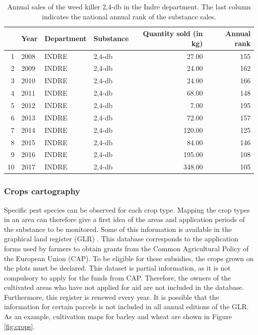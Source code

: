 \begin{table}[ht]
\centering
\begin{tabular}{rlllrr}
  \hline
 & Year & Department & Substance & Quantity sold (in kg) & Annual rank \\ 
  \hline
1 & 2008 & INDRE & 2,4-db & 27.00 & 155 \\ 
  2 & 2009 & INDRE & 2,4-db & 24.00 & 162 \\ 
  3 & 2010 & INDRE & 2,4-db & 24.00 & 166 \\ 
  4 & 2011 & INDRE & 2,4-db & 68.00 & 148 \\ 
  5 & 2012 & INDRE & 2,4-db & 7.00 & 195 \\ 
  6 & 2013 & INDRE & 2,4-db & 72.00 & 157 \\ 
  7 & 2014 & INDRE & 2,4-db & 120.00 & 125 \\ 
  8 & 2015 & INDRE & 2,4-db & 84.00 & 146 \\ 
  9 & 2016 & INDRE & 2,4-db & 195.00 & 108 \\ 
  10 & 2017 & INDRE & 2,4-db & 348.00 & 105 \\ 
   \hline
\end{tabular}
   \caption{Annual sales of the weed killer 2,4-db in the Indre department. The last column indicates the national annual rank of the substance sales.}\label{tab:bnvd}
\end{table}

\subsubsection{Crops cartography}

Specific pest species can be observed for each crop type. Mapping the crop types in an area can therefore give a first idea of the areas and application periods of the substance to be monitored. Some of this information is available in the graphical land register (GLR) \citep{RPG}. This database corresponds to the application forms used by farmers to obtain grants from the Common Agricultural Policy of the European Union (CAP). To be eligible for these subsidies, the crops grown on the plots must be declared. This dataset is partial information, as it is not compulsory to apply for the funds from CAP. Therefore, the owners of the cultivated areas who have not applied for aid are not included in the database. Furthermore, this register is renewed every year. It is possible that the information for certain parcels is not included in all annual editions of the GLR. As an example, cultivation maps for barley and wheat are shown in Figure \ref{fig:crops}.

